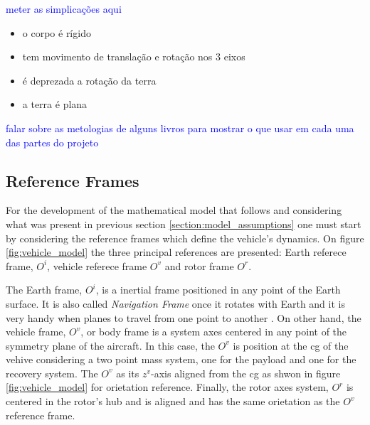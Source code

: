 \textcolor{blue}{meter as simplicações aqui}

\begin{itemize}
    \item o corpo é rígido
    \item tem movimento de translação e rotação nos 3 eixos
    \item é deprezada a rotação da terra
    \item a terra é plana
\end{itemize}

\textcolor{blue}{falar sobre as metologias de alguns livros para mostrar o que usar em cada uma das partes do projeto}

\subsection{Reference Frames}
\label{section:referece_frames}

For the development of the mathematical model that follows and considering what was present in previous section \ref{section:model_assumptions} one must start by considering the reference frames which define the vehicle's dynamics. On figure \ref{fig:vehicle_model} the three principal references are presented: Earth referece frame, $O^i$, vehicle referece frame $O^v$ and rotor frame $O^r$.

The Earth frame, $O^i$, is a inertial frame positioned in any point of the Earth surface. It is also called \textit{Navigation Frame} once it rotates with Earth and it is very handy when planes to travel from one point to another \cite{soler_fundamentals_2014}. On other hand, the vehicle frame, $O^v$,  or body frame \cite{soler_fundamentals_2014} is a system axes centered in any point of the symmetry plane of the aircraft. In this case, the $O^v$ is position at the \gls{cg} of the vehive considering a two point mass system, one for the payload and one for the recovery system. The $O^v$ as its $z^v$-axis aligned from the \gls{cg} as shwon in figure \ref{fig:vehicle_model} for orietation reference. Finally, the rotor axes system, $O^r$ is centered in the rotor's hub and is aligned and has the same orietation as the $O^v$ reference frame.


